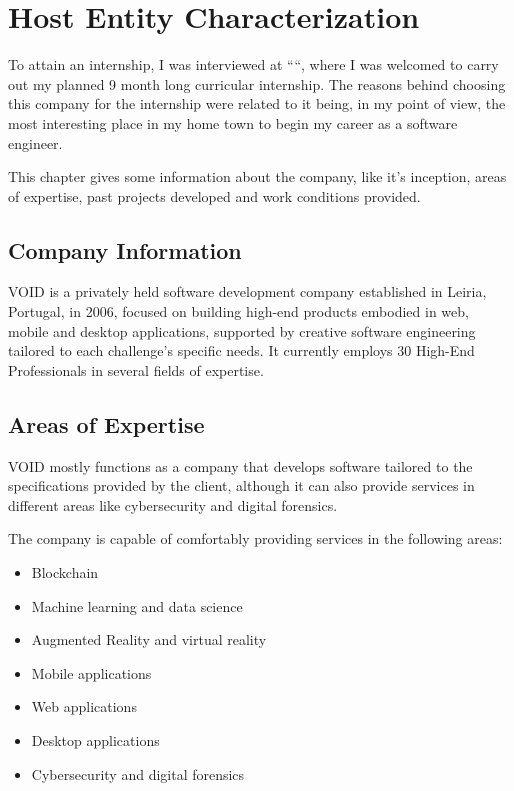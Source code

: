 
\chapter{Host Entity Characterization}
\label{ch:background}

To attain an internship, I was interviewed at ``\company``, where I was welcomed to carry out my planned 9 month long curricular internship.
The reasons behind choosing this company for the internship were related to it being, in my point of view, the most interesting place in my home town 
to begin my career as a software engineer.

This chapter gives some information about the company, like it's inception, areas of expertise, past projects developed and work conditions provided.

\section{Company Information}

VOID is a privately held software development company established in Leiria, Portugal, in 2006, focused on building high-end products embodied in web, 
mobile and desktop applications, supported by creative software engineering tailored to each challenge's specific needs. 
It currently employs 30 High-End Professionals in several fields of expertise.

\section{Areas of Expertise}

VOID mostly functions as a company that develops software tailored to the specifications provided by the client, although 
it can also provide services in different areas like cybersecurity and digital forensics.

The company is capable of comfortably providing services in the following areas:
\begin{itemize}
 \item Blockchain
 \item Machine learning and data science
 \item Augmented Reality and virtual reality
 \item Mobile applications
 \item Web applications
 \item Desktop applications
 \item Cybersecurity and digital forensics
\end{itemize}

